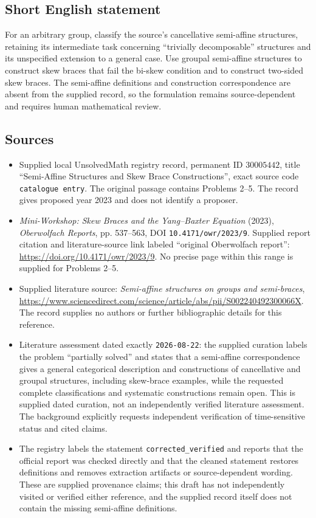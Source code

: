 \documentclass[11pt]{article}
\begin{document}
\subsection{Short English statement}
For an arbitrary group, classify the source's cancellative semi-affine structures, retaining its intermediate task concerning ``trivially decomposable'' structures and its unspecified extension to a general case. Use groupal semi-affine structures to construct skew braces that fail the bi-skew condition and to construct two-sided skew braces. The semi-affine definitions and construction correspondence are absent from the supplied record, so the formulation remains source-dependent and requires human mathematical review.
\subsection{Sources}
\begin{itemize}
\item Supplied local UnsolvedMath registry record, permanent ID \(30005442\), title ``Semi-Affine Structures and Skew Brace Constructions'', exact source code \texttt{catalogue entry}. The original passage contains Problems 2--5. The record gives proposed year 2023 and does not identify a proposer.
\item \emph{Mini-Workshop: Skew Braces and the Yang--Baxter Equation} (2023), \emph{Oberwolfach Reports}, pp. 537--563, DOI \texttt{10.4171/owr/2023/9}. Supplied report citation and literature-source link labeled ``original Oberwolfach report'': \url{https://doi.org/10.4171/owr/2023/9}. No precise page within this range is supplied for Problems 2--5.
\item Supplied literature source: \emph{Semi-affine structures on groups and semi-braces}, \url{https://www.sciencedirect.com/science/article/abs/pii/S002240492300066X}. The record supplies no authors or further bibliographic details for this reference.
\item Literature assessment dated exactly \texttt{2026-08-22}: the supplied curation labels the problem ``partially solved'' and states that a semi-affine correspondence gives a general categorical description and constructions of cancellative and groupal structures, including skew-brace examples, while the requested complete classifications and systematic constructions remain open. This is supplied dated curation, not an independently verified literature assessment. The background explicitly requests independent verification of time-sensitive status and cited claims.
\item The registry labels the statement \texttt{corrected\_verified} and reports that the official report was checked directly and that the cleaned statement restores definitions and removes extraction artifacts or source-dependent wording. These are supplied provenance claims; this draft has not independently visited or verified either reference, and the supplied record itself does not contain the missing semi-affine definitions.
\end{itemize}
\end{document}
